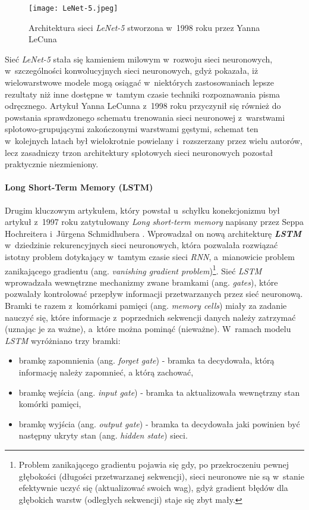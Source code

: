 \begin{figure}[!h]
    \centering \texttt{[image: LeNet-5.jpeg]}
    \captionsetup{format=hang}
    \caption{Architektura sieci \emph{LeNet-5} stworzona w~1998 roku przez Yanna LeCuna \cite{lecun2}}
    \label{fig:lenet1}
\end{figure}

Sieć \emph{LeNet-5} stała się kamieniem milowym w~rozwoju sieci neuronowych, w~szczególności konwolucyjnych sieci neuronowych, gdyż pokazała, iż wielowarstwowe modele mogą osiągać w~niektórych zastosowaniach lepsze rezultaty niż inne dostępne w~tamtym czasie techniki rozpoznawania pisma odręcznego. Artykuł Yanna LeCunna z~1998 roku przyczynił się również do powstania sprawdzonego schematu trenowania sieci neuronowej z~warstwami splotowo-grupującymi zakończonymi warstwami gęstymi, schemat ten w~kolejnych latach był wielokrotnie powielany i~rozszerzany przez wielu autorów, lecz zasadniczy trzon architektury splotowych sieci neuronowych pozostał praktycznie niezmieniony.

\paragraph*{Long Short-Term Memory (LSTM)}

Drugim kluczowym artykułem, który powstał u~schyłku konekcjonizmu był artykuł z~1997 roku zatytułowany \emph{Long short-term memory} napisany przez Seppa Hochreitera i~Jürgena Schmidhubera \cite{hochreiter}. Wprowadzał on nową architekturę \textbf{\emph{LSTM}} w~dziedzinie rekurencyjnych sieci neuronowych, która pozwalała rozwiązać istotny problem dotykający w~tamtym czasie sieci \emph{RNN}, a~mianowicie problem zanikającego gradientu (ang. \emph{vanishing gradient problem})\footnote{Problem zanikającego gradientu pojawia się gdy, po przekroczeniu pewnej głębokości (długości przetwarzanej sekwencji), sieci neuronowe nie są w~stanie efektywnie uczyć się (aktualizować swoich wag), gdyż gradient błędów dla głębokich warstw (odległych sekwencji) staje się zbyt mały.}. Sieć \emph{LSTM} wprowadzała wewnętrzne mechanizmy zwane bramkami (ang. \emph{gates}), które pozwalały kontrolować przepływ informacji przetwarzanych przez sieć neuronową. Bramki te razem z~komórkami pamięci (ang. \emph{memory cells}) miały za zadanie nauczyć się, które informacje z~poprzednich sekwencji danych należy zatrzymać (uznając je za ważne), a~które można pominąć (nieważne). W~ramach modelu \emph{LSTM} wyróżniano trzy bramki:

\begin{itemize}
\item bramkę zapomnienia (ang. \emph{forget gate}) - bramka ta decydowała, którą informację należy zapomnieć, a którą zachować,
\item bramkę wejścia (ang. \emph{input gate}) - bramka ta aktualizowała wewnętrzny stan komórki pamięci,
\item bramkę wyjścia (ang. \emph{output gate}) - bramka ta decydowała jaki powinien być następny ukryty stan (ang. \emph{hidden state}) sieci. 
\end{itemize}

